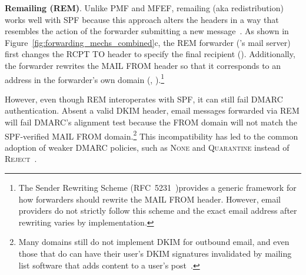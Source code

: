 


\textbf{Remailing (REM)}. Unlike PMF and MFEF, remailing (aka redistribution)
works well with SPF because this approach alters the headers in a way that resembles the action of the forwarder submitting a new message~\cite{SenderRe69:online}.
As shown in Figure~\ref{fig:forwarding_mechs_combined}c, the REM
forwarder ('s mail server) first changes the
\textsc{RCPT TO} header to specify the final recipient ().
Additionally, the forwarder rewrites the \textsc{MAIL FROM} header so that it
corresponds to an address in the forwarder's own domain (\eg,
).\footnote{The Sender Rewriting Scheme
(RFC~5231~\cite{rfc5231})provides a generic framework for how forwarders should
rewrite the \textsc{MAIL FROM} header.  However, email providers do not
strictly follow this scheme and the exact email address after rewriting varies
by implementation.}

However, even though REM interoperates with SPF, it can still fail DMARC
authentication.  Absent a valid DKIM header, email messages forwarded
via REM will fail DMARC's alignment test because the \textsc{FROM}
domain will not match the SPF-verified \textsc{MAIL FROM}
domain.\footnote{Many domains still do not implement DKIM for outbound email, and even
  those that do can have their user's DKIM signatures invalidated by mailing
  list software that adds content to a user's post~\cite{rfc6783}.}
This incompatibility has led to the common adoption of weaker DMARC policies,
such as \textsc{None} and \textsc{Quarantine} instead of
\textsc{Reject}~\cite{hutowardsunderstanding}.

